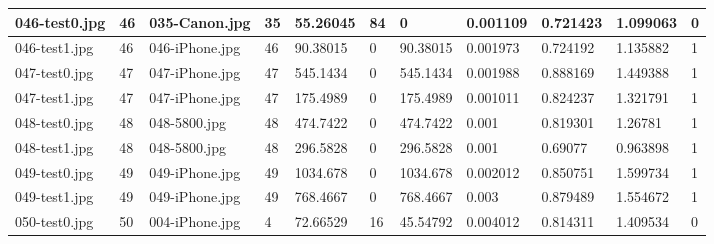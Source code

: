 \begin{landscape}
\begin{longtable}{|p{2cm}|p{1cm}|p{2cm}|p{1cm}|p{2cm}|p{1cm}|p{2cm}|p{2cm}|p{2cm}|p{2cm}|p{1cm}|}
		046-test0.jpg   & 46               & 035-Canon.jpg         & 35                          & 55.26045              & 84                      & 0                          & 0.001109              & 0.721423              & 1.099063                 & 0                \\ \hline
		046-test1.jpg   & 46               & 046-iPhone.jpg        & 46                          & 90.38015              & 0                       & 90.38015                   & 0.001973              & 0.724192              & 1.135882                 & 1                \\ \hline
		047-test0.jpg   & 47               & 047-iPhone.jpg        & 47                          & 545.1434              & 0                       & 545.1434                   & 0.001988              & 0.888169              & 1.449388                 & 1                \\ \hline
		047-test1.jpg   & 47               & 047-iPhone.jpg        & 47                          & 175.4989              & 0                       & 175.4989                   & 0.001011              & 0.824237              & 1.321791                 & 1                \\ \hline
		048-test0.jpg   & 48               & 048-5800.jpg          & 48                          & 474.7422              & 0                       & 474.7422                   & 0.001                 & 0.819301              & 1.26781                  & 1                \\ \hline
		048-test1.jpg   & 48               & 048-5800.jpg          & 48                          & 296.5828              & 0                       & 296.5828                   & 0.001                 & 0.69077               & 0.963898                 & 1                \\ \hline
		049-test0.jpg   & 49               & 049-iPhone.jpg        & 49                          & 1034.678              & 0                       & 1034.678                   & 0.002012              & 0.850751              & 1.599734                 & 1                \\ \hline
		049-test1.jpg   & 49               & 049-iPhone.jpg        & 49                          & 768.4667              & 0                       & 768.4667                   & 0.003                 & 0.879489              & 1.554672                 & 1                \\ \hline
		050-test0.jpg   & 50               & 004-iPhone.jpg        & 4                           & 72.66529              & 16                      & 45.54792                   & 0.004012              & 0.814311              & 1.409534                 & 0                \\ \hline

\end{longtable}
\end{landscape}
